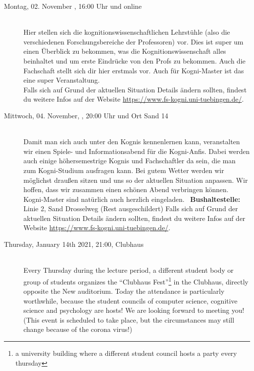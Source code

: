 \begin{description}
\ifkogwiss
\item[Montag, 02. November \YEAR, 16:00 Uhr und online]\ \\
    Hier stellen sich die kognitionswissenschaftlichen Lehrstühle (also die verschiedenen Forschungsbereiche der Professoren) vor. Dies ist super um einen Überblick zu bekommen, was die Kognitionswissenschaft alles beinhaltet und um erste Eindrücke von den Profs zu bekommen. Auch die Fachschaft stellt sich dir hier erstmals vor. %
    Auch für Kogni-Master ist das eine super Veranstaltung. \\
    Falls sich auf Grund der aktuellen Situation Details ändern sollten, findest du weitere Infos auf der Website \url{https://www.fs-kogni.uni-tuebingen.de/}.
    
\fi

\ifkogwiss
    \item[Mittwoch, 04. November, \YEAR, 20:00 Uhr und Ort Sand 14]\ \\
         Damit man sich auch unter den Kognis kennenlernen kann, veranstalten wir einen Spiele- und Informationsabend für die Kogni-Anfis. Dabei werden auch einige höhersemestrige Kognis und Fachschaftler da sein, die man zum Kogni-Studium ausfragen kann. Bei gutem Wetter werden wir möglichst draußen sitzen und uns so der aktuellen Situation anpassen. Wir hoffen, dass wir zusammen einen schönen Abend verbringen können. Kogni-Master sind natürlich auch herzlich eingeladen.
	~\textbf{Bushaltestelle:} Linie 2, Sand Drosselweg (Rest ausgeschildert)
	Falls sich auf Grund der aktuellen Situation Details ändern sollten, findest du weitere Infos auf der Website \url{https://www.fs-kogni.uni-tuebingen.de/}.
\fi

\ifml
    \item[Thursday, January 14th 2021, 21:00, Clubhaus]\ \\
        Every Thursday during the lecture period, a different student body or group of students organizes the "`Clubhaus Fest"'\footnote{a university building where a different student council hosts a party every thursday} in the Clubhaus, directly opposite the New auditorium. Today the attendance is particularly worthwhile, because the student councils of computer science, cognitive science and psychology are hosts! We are looking forward to meeting you!(This event is scheduled to take place, but the circumstances may still change because of the corona virus!)


\end{description}
